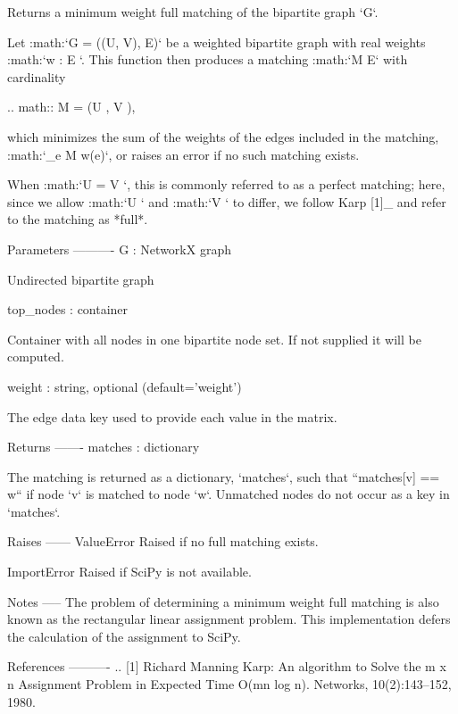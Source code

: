 \begin{DoxyVerb}Returns a minimum weight full matching of the bipartite graph `G`.

Let :math:`G = ((U, V), E)` be a weighted bipartite graph with real weights
:math:`w : E \to {}`. This function then produces a matching
:math:`M \subseteq E` with cardinality

.. math::
   \lvert M \rvert = \min(\lvert U \rvert, \lvert V \rvert),

which minimizes the sum of the weights of the edges included in the
matching, :math:`\sum_{e \in M} w(e)`, or raises an error if no such
matching exists.

When :math:`\lvert U \rvert = \lvert V \rvert`, this is commonly
referred to as a perfect matching; here, since we allow
:math:`\lvert U \rvert` and :math:`\lvert V \rvert` to differ, we
follow Karp [1]_ and refer to the matching as *full*.

Parameters
----------
G : NetworkX graph

  Undirected bipartite graph

top_nodes : container

  Container with all nodes in one bipartite node set. If not supplied
  it will be computed.

weight : string, optional (default='weight')

   The edge data key used to provide each value in the matrix.

Returns
-------
matches : dictionary

  The matching is returned as a dictionary, `matches`, such that
  ``matches[v] == w`` if node `v` is matched to node `w`. Unmatched
  nodes do not occur as a key in `matches`.

Raises
------
ValueError
  Raised if no full matching exists.

ImportError
  Raised if SciPy is not available.

Notes
-----
The problem of determining a minimum weight full matching is also known as
the rectangular linear assignment problem. This implementation defers the
calculation of the assignment to SciPy.

References
----------
.. [1] Richard Manning Karp:
   An algorithm to Solve the m x n Assignment Problem in Expected Time
   O(mn log n).
   Networks, 10(2):143–152, 1980.\end{DoxyVerb}
 \mbox{\label{namespacenetworkx_1_1algorithms_1_1bipartite_1_1matching_a96c6a1cdd9dd0838060648c8b5cf0514}} 
